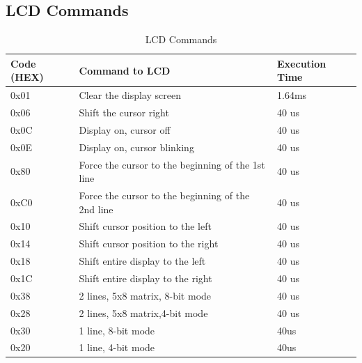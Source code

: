 \documentclass[12pt, a4paper, twoside]{report}
\begin{document}
\subsection{LCD Commands}
\begin{table}[!h]
\centering
\begin{tabular}{|p{}|p{}|p{}|}
\hline
\textbf{Code (HEX)} & \textbf{Command to LCD}                                                                 & \textbf{Execution Time} \\ \hline
0x01                & Clear the display screen                                                                & 1.64ms                  \\ \hline
0x06                & Shift the cursor right  & 40 us                   \\ \hline
0x0C                & Display on, cursor off                                                                  & 40 us                   \\ \hline
0x0E                & Display on, cursor blinking                                                             & 40 us                   \\ \hline
0x80                & Force the cursor to the beginning of the 1st line                                       & 40 us                   \\ \hline
0xC0                & Force the cursor to the beginning of the 2nd line                                       & 40 us                   \\ \hline
0x10                & Shift cursor position to the left                                                       & 40 us                   \\ \hline
0x14                & Shift cursor position to the right                                                      & 40 us                   \\ \hline
0x18                & Shift entire display to the left                                                        & 40 us                   \\ \hline
0x1C                & Shift entire display to the right                                                       & 40 us                   \\ \hline
0x38                & 2 lines, 5x8 matrix, 8-bit mode                                                         & 40 us                   \\ \hline
0x28                & 2 lines, 5x8 matrix,4-bit mode                                                          & 40 us                   \\ \hline
0x30                & 1 line, 8-bit mode                                                                      & 40us                    \\ \hline
0x20                & 1 line, 4-bit mode                                                                      & 40us                    \\ \hline
\end{tabular}
\caption{LCD Commands}
\label{tab:lcd-commands}
\end{table}
\end{document}
